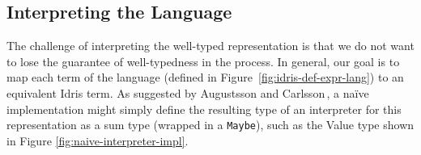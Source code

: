 

\subsection{Interpreting the Language}
The challenge of interpreting the well-typed representation is that we do not want to lose the guarantee of well-typedness in the process. In general, our goal is to map each term of the language (defined in Figure~\ref{fig:idris-def-expr-lang}) to an equivalent Idris term. As suggested by Augustsson and Carlsson\,\cite{Augustsson99anexercise}, a na\"{i}ve implementation might simply define the resulting type of an interpreter for this representation as a sum type (wrapped in a \texttt{Maybe}), such as the Value type shown in Figure \ref{fig:naive-interpreter-impl}.

